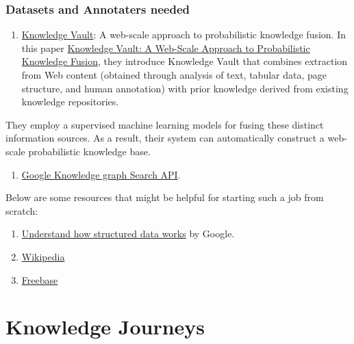 \documentclass[]{book}
\providecommand{\tightlist}{%
  \setlength{\itemsep}{0pt}\setlength{\parskip}{0pt}}
\theoremstyle{definition}
\theoremstyle{definition}
\theoremstyle{definition}
\theoremstyle{remark}
\begin{document}
\subsubsection{Datasets and Annotaters
needed}\label{datasets-and-annotaters-needed}

\begin{enumerate}
\def\labelenumi{\arabic{enumi}.}
\tightlist
\item
  \href{https://ai.google/research/pubs/pub45634}{Knowledge Vault}: A
  web-scale approach to probabilistic knowledge fusion. In this paper
  \href{https://dejanseo.com.au/wp-content/uploads/2014/08/Knowledge-Vault-A-Web-Scale-Approach-to-Probabilistic-Knowledge-Fusion.pdf}{Knowledge
  Vault: A Web-Scale Approach to Probabilistic Knowledge Fusion}, they
  introduce Knowledge Vault that combines extraction from Web content
  (obtained through analysis of text, tabular data, page structure, and
  human annotation) with prior knowledge derived from existing knowledge
  repositories.
\end{enumerate}

They employ a supervised machine learning models for fusing these
distinct information sources. As a result, their system can
automatically construct a web-scale probabilistic knowledge base.

\begin{enumerate}
\def\labelenumi{\arabic{enumi}.}
\setcounter{enumi}{1}
\tightlist
\item
  \href{https://developers.google.com/knowledge-graph/\#knowledge_graph_entities}{Google
  Knowledge graph Search API}.
\end{enumerate}

Below are some resources that might be helpful for starting such a job
from scratch:

\begin{enumerate}
\def\labelenumi{\arabic{enumi}.}
\setcounter{enumi}{2}
\item
  \href{https://developers.google.com/search/docs/guides/intro-structured-data}{Understand
  how structured data works} by Google.
\item
  \href{wikipedia.com}{Wikipedia}
\item
  \href{Freebase.com}{Freebase}
\end{enumerate}

\section{Knowledge Journeys}\label{knowledge-journeys-1}
\end{document}
